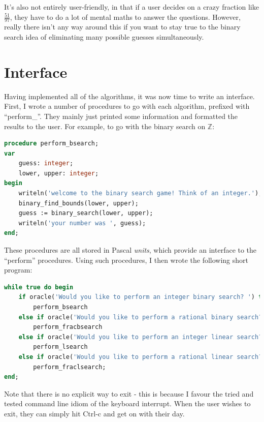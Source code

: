 \documentclass{article}
\begin{document}
    It's also not entirely user-friendly, in that if a user decides on a crazy
    fraction like $\frac{51}{97}$, they have to do a lot of mental maths to
    answer the questions. However, really there isn't any way around this if
    you want to stay true to the binary search idea of eliminating many
    possible guesses simultaneously.

    \section{Interface}
    Having implemented all of the algorithms, it was now time to write an
    interface. First, I wrote a number of procedures to go with each algorithm,
    prefixed with ``perform\_''. They mainly just printed some information and
    formatted the results to the user. For example, to go with the binary
    search on $\mathbb{Z}$:

\begin{lstlisting}[language=Pascal, caption=Binary search on $\mathbb{Z}$ wrapper procedure]
procedure perform_bsearch;
var
    guess: integer;
    lower, upper: integer;
begin
    writeln('welcome to the binary search game! Think of an integer.');
    binary_find_bounds(lower, upper);
    guess := binary_search(lower, upper);
    writeln('your number was ', guess);
end;
\end{lstlisting}

    These procedures are all stored in Pascal \textit{units}, which provide an
    interface to the ``perform'' procedures. Using such procedures, I then
    wrote the following short program:

\begin{lstlisting}[language=Pascal, caption=Main interface loop]
while true do begin
    if oracle('Would you like to perform an integer binary search? ') then
        perform_bsearch
    else if oracle('Would you like to perform a rational binary search? ') then
        perform_fracbsearch
    else if oracle('Would you like to perform an integer linear search? ') then
        perform_lsearch
    else if oracle('Would you like to perform a rational linear search? ') then
        perform_fraclsearch;
end;
\end{lstlisting} 

    Note that there is no explicit way to exit - this is because I favour the
    tried and tested command line idiom of the keyboard interrupt. When the
    user wishes to exit, they can simply hit Ctrl-c and get on with their day.
\end{document}
